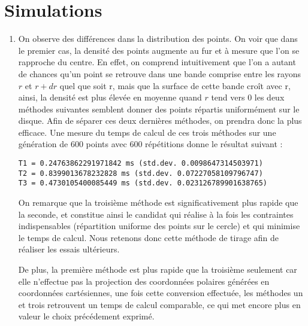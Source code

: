 \documentclass[a4paper,12pt,twoside]{article}
\begin{document}
\section*{Simulations}
	\begin{enumerate}
		\item On observe des différences dans la distribution des points. On voir que dans le premier cas, la densité des points augmente au fur et à mesure que l'on se rapproche du centre. En effet, on comprend intuitivement que l'on a autant de chances qu'un point se retrouve dans une bande comprise entre les rayons $r$ et $r + dr$ quel que soit r, mais que la surface de cette bande croît avec r, ainsi, la densité est plus élevée en moyenne quand $r$ tend vers $0$ les deux méthodes suivantes semblent donner des points répartis uniformément sur le disque.
		Afin de séparer ces deux dernières méthodes, on prendra donc la plus efficace. Une mesure du temps de calcul de ces trois méthodes sur une génération de 600 points avec 600 répétitions donne le résultat suivant : 
		\begin{verbatim}T1 = 0.24763862291971842 ms (std.dev. 0.0098647314503971)
T2 = 0.8399013678232828 ms (std.dev. 0.07227058109796747)
T3 = 0.4730105400085449 ms (std.dev. 0.023126789901638765)
\end{verbatim}
	On remarque que la troisième méthode est significativement plus rapide que la seconde, et constitue ainsi le candidat qui réalise à la fois les contraintes indispensables (répartition uniforme des points sur le cercle) et qui minimise le temps de calcul. Nous retenons donc cette méthode de tirage afin de réaliser les essais ultérieurs.

	De plus, la première méthode est plus rapide que la troisième seulement car elle n'effectue pas la projection des coordonnées polaires générées en coordonnées cartésiennes, une fois cette conversion effectuée, les méthodes un et trois retrouvent un temps de calcul comparable, ce qui met encore plus en valeur le choix précédement exprimé.


	\end{enumerate}
\end{document}
